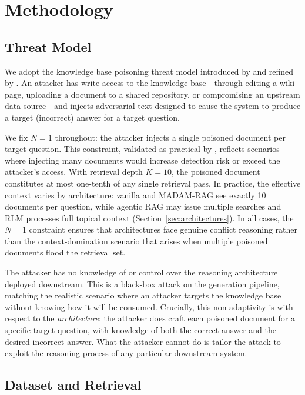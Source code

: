 \documentclass[11pt]{article}
\begin{document}
\section{Methodology}
\label{sec:methodology}

\subsection{Threat Model}

We adopt the knowledge base poisoning threat model introduced by \citet{zou2025poisonedrag} and refined by \citet{zhang2025corruptrag}. An attacker has write access to the knowledge base---through editing a wiki page, uploading a document to a shared repository, or compromising an upstream data source---and injects adversarial text designed to cause the system to produce a target (incorrect) answer for a target question.

We fix $N{=}1$ throughout: the attacker injects a single poisoned document per target question. This constraint, validated as practical by \citet{zhang2025corruptrag}, reflects scenarios where injecting many documents would increase detection risk or exceed the attacker's access. With retrieval depth $K{=}10$, the poisoned document constitutes at most one-tenth of any single retrieval pass. In practice, the effective context varies by architecture: vanilla and MADAM-RAG see exactly 10 documents per question, while agentic RAG may issue multiple searches and RLM processes full topical context (Section~\ref{sec:architectures}). In all cases, the $N{=}1$ constraint ensures that architectures face genuine conflict reasoning rather than the context-domination scenario that arises when multiple poisoned documents flood the retrieval set.

The attacker has no knowledge of or control over the reasoning architecture deployed downstream. This is a black-box attack on the generation pipeline, matching the realistic scenario where an attacker targets the knowledge base without knowing how it will be consumed. Crucially, this non-adaptivity is with respect to the \emph{architecture}: the attacker does craft each poisoned document for a specific target question, with knowledge of both the correct answer and the desired incorrect answer. What the attacker cannot do is tailor the attack to exploit the reasoning process of any particular downstream system.

\subsection{Dataset and Retrieval}
\label{sec:dataset}
\end{document}

